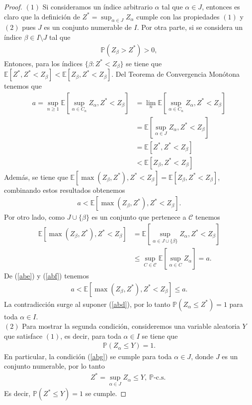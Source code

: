 \begin{proof}
\noindent $(1)$ Si consideramos un índice arbitrario $\alpha$ tal que $\alpha \in J$, entonces es claro que la definición de $Z^{*} = \sup_{\alpha \in J} Z_\alpha$ cumple con las propiedades $(1)$ y $(2)$ pues $J$ es un conjunto numerable de $I$. Por otra parte, si se considera un índice $\beta \in I \setminus J$ tal que
	\begin{align}
	\mathbb{P}(Z_\beta > Z^{*}) > 0, \label{abd}
	\end{align}
Entonces, para los índices $\{ \beta : Z^{*} < Z_\beta\}$ se tiene que $\mathbb{E}[Z^{*}, Z^{*} < Z_\beta] < \mathbb{E}[Z_\beta, Z^{*} < Z_\beta]$. Del Teorema de Convergencia Monótona tenemos que 
	\begin{align*}
	a = \sup_{n \geq 1} \mathbb{E} \left[ \sup_{\alpha \in C_n} Z_{\alpha},  Z^{*} < Z_\beta \right] & = \lim_n \mathbb{E}\left[ \sup_{\alpha \in C_n} Z_{\alpha},  Z^{*} < Z_\beta \right] \\
    & = \mathbb{E}\left[ \sup_{\alpha \in J} Z_\alpha,  Z^{*} < Z_\beta \right] \\ 
    & = \mathbb{E}[Z^{*},  Z^{*} < Z_\beta] \\
    & < \mathbb{E}[Z_\beta,  Z^{*} < Z_\beta]
	\end{align*}
Además, se tiene que $\mathbb{E}[\max (Z_\beta, Z^{*}),  Z^{*} < Z_\beta] = \mathbb{E}[Z_\beta,  Z^{*} < Z_\beta]$, combinando estos resultados obtenemos
	\begin{align}
	a < \mathbb{E}[\max (Z_\beta, Z^{*}),  Z^{*} < Z_\beta]. \label{abe}
	\end{align}
Por otro lado, como $J \cup \{\beta\}$ es un conjunto que pertenece a $\mathcal{C}$ tenemos 
	\begin{align}
	\mathbb{E} \left[ \max (Z_\beta, Z^{*}),  Z^{*} < Z_\beta \right] & = \mathbb{E} \left[ \sup_{\alpha \in J \cup \{\beta\}} Z_\alpha,  Z^{*} < Z_\beta \right] \nonumber \\
    & \leq \sup_{C \in \mathcal{C}} \mathbb{E} \left[ \sup_{\alpha \in C} Z_{\alpha} \right] = a. \label{abf}
	\end{align}
De (\ref{abe}) y (\ref{abf}) tenemos
	\begin{align*}
	a < \mathbb{E} \left[ \max (Z_\beta, Z^{*}),  Z^{*} < Z_\beta \right] \leq a.
	\end{align*}
La contradicción surge al suponer (\ref{abd}), por lo tanto $\mathbb{P}(Z_\alpha \leq Z^{*}) = 1$ para toda $\alpha \in I$. \\

\noindent $(2)$ Para mostrar la segunda condición, consideremos una variable aleatoria $Y$ que satisface $(1)$, es decir, para toda $\alpha \in I$ se tiene que
	\begin{align}
	\mathbb{P}(Z_\alpha \leq Y) = 1. \label{abg}
	\end{align}
En particular, la condición (\ref{abg}) se cumple para toda $\alpha \in J$, donde $J$ es un conjunto numerable, por lo tanto
	\begin{align*}
	Z^{*} = \sup_{\alpha \in J} Z_\alpha \leq Y, \ \mathbb{P}\text{-c.s. } 
	\end{align*}
Es decir, $\mathbb{P}(Z^{*} \leq Y) = 1$ se cumple.
\end{proof}

